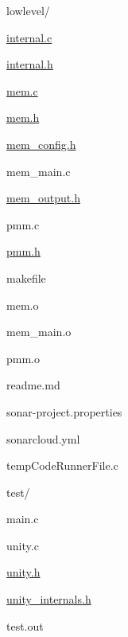 \begin{DoxyItemize}
\item lowlevel/
\begin{DoxyItemize}
\item \mbox{\hyperlink{internal_8c}{internal.\+c}}
\item \mbox{\hyperlink{internal_8h}{internal.\+h}}
\item \mbox{\hyperlink{mem_8c}{mem.\+c}}
\item \mbox{\hyperlink{mem_8h}{mem.\+h}}
\item \mbox{\hyperlink{mem__config_8h}{mem\+\_\+config.\+h}}
\item mem\+\_\+main.\+c
\item \mbox{\hyperlink{mem__output_8h}{mem\+\_\+output.\+h}}
\item pmm.\+c
\item \mbox{\hyperlink{pmm_8h_source}{pmm.\+h}}
\end{DoxyItemize}
\item makefile
\item mem.\+o
\item mem\+\_\+main.\+o
\item pmm.\+o
\item readme.\+md
\item sonar-\/project.\+properties
\item sonarcloud.\+yml
\item temp\+Code\+Runner\+File.\+c
\item test/
\begin{DoxyItemize}
\item main.\+c
\item unity.\+c
\item \mbox{\hyperlink{unity_8h_source}{unity.\+h}}
\item \mbox{\hyperlink{unity__internals_8h_source}{unity\+\_\+internals.\+h}}
\end{DoxyItemize}
\item test.\+out 
\end{DoxyItemize}